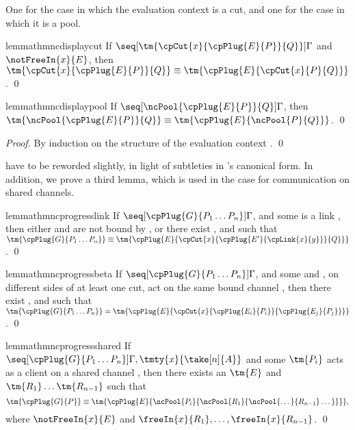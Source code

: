 \documentclass[UKenglish]{llncs}
\begin{document}
One for the case in which the evaluation context is a cut, and one for the case
in which it is a pool.
\begin{restatable}{lemma}{thmncdisplaycut}\label{thm:nc-display-cut}
  If $\seq[{ \tm{\cpCut{x}{\cpPlug{E}{P}}{Q}} }]{ \Gamma }$ and
  $\notFreeIn{x}{E}$, then $\tm{\cpCut{x}{\cpPlug{E}{P}}{Q}} \equiv
  \tm{\cpPlug{E}{\cpCut{x}{P}{Q}}}$.
  \qed
\end{restatable}
\begin{restatable}{lemma}{thmncdisplaypool}\label{thm:nc-display-pool}
  If $\seq[{ \ncPool{\cpPlug{E}{P}}{Q} }]{ \Gamma }$, then
  $\tm{\ncPool{\cpPlug{E}{P}}{Q}} \equiv \tm{\cpPlug{E}{\ncPool{P}{Q}}}$. 
  \qed
\end{restatable}
\begin{proof}
  By induction on the structure of the evaluation context .
  \qed
\end{proof}
 have to be reworded slightly,
in light of subtleties in \nodcap's canonical form.
In addition, we prove a third lemma, which is used in the case for communication
on shared channels.
\begin{restatable}{lemma}{thmncprogresslink}\label{thm:nc-progress-link}
  If $\seq[{ \cpPlug{G}{P_1 \dots P_n} }]{ \Gamma }$, and some  is a
  link , then either  and  are not bound by
  , or there exist ,  and  such that
  $\tm{\cpPlug{G}{P_1 \dots P_n}} \equiv
  \tm{\cpPlug{E}{\cpCut{x}{\cpPlug{E'}{\cpLink{x}{y}}}{Q}}}$.
  \qed
\end{restatable}
\begin{restatable}{lemma}{thmncprogressbeta}\label{thm:nc-progress-beta}
  If $\seq[{ \cpPlug{G}{P_1 \dots P_n} }]{ \Gamma }$, and some  and
  , on different sides of at least one cut, act on the same bound
  channel , then there exist ,  and  such that 
  \(
  \tm{\cpPlug{G}{P_1 \dots P_n}} =
  \tm{\cpPlug{E}{\cpCut{x}{\cpPlug{E_i}{P_i}}{\cpPlug{E_j}{P_j}}}}
  \).
  \qed
\end{restatable}
\begin{restatable}{lemma}{thmncprogressshared}\label{thm:nc-progress-shared}
  If $\seq[{ \cpPlug{G}{P_1 \dots P_n} }]{ \Gamma, \tmty{x}{\take[n]{A}} }$ and
  some $\tm{P_i}$ acts as a client on a shared channel , then there exists
  an $\tm{E}$ and $\tm{R_1}\dots\tm{R_{n-1}}$ such that
  \[
    \tm{\cpPlug{G}{P}} \equiv
    \tm{\cpPlug{E}{\ncPool{P_i}{\ncPool{R_1}{\ncPool{\dots}{R_{n-1}}\dots}}}},
  \]
  where $\notFreeIn{x}{E}$ and $\freeIn{x}{R_1},\dots,\freeIn{x}{R_{n-1}}$.
  \qed
\end{restatable}
\end{document}
